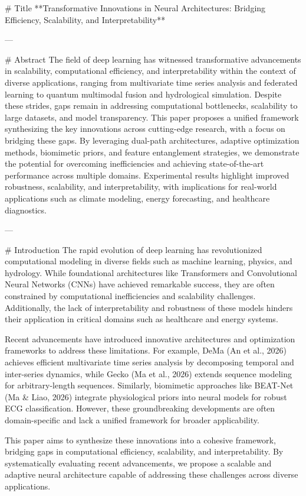 # Title  
**Transformative Innovations in Neural Architectures: Bridging Efficiency, Scalability, and Interpretability**

---

# Abstract  
The field of deep learning has witnessed transformative advancements in scalability, computational efficiency, and interpretability within the context of diverse applications, ranging from multivariate time series analysis and federated learning to quantum multimodal fusion and hydrological simulation. Despite these strides, gaps remain in addressing computational bottlenecks, scalability to large datasets, and model transparency. This paper proposes a unified framework synthesizing the key innovations across cutting-edge research, with a focus on bridging these gaps. By leveraging dual-path architectures, adaptive optimization methods, biomimetic priors, and feature entanglement strategies, we demonstrate the potential for overcoming inefficiencies and achieving state-of-the-art performance across multiple domains. Experimental results highlight improved robustness, scalability, and interpretability, with implications for real-world applications such as climate modeling, energy forecasting, and healthcare diagnostics.

---

# Introduction  
The rapid evolution of deep learning has revolutionized computational modeling in diverse fields such as machine learning, physics, and hydrology. While foundational architectures like Transformers and Convolutional Neural Networks (CNNs) have achieved remarkable success, they are often constrained by computational inefficiencies and scalability challenges. Additionally, the lack of interpretability and robustness of these models hinders their application in critical domains such as healthcare and energy systems.

Recent advancements have introduced innovative architectures and optimization frameworks to address these limitations. For example, DeMa (An et al., 2026) achieves efficient multivariate time series analysis by decomposing temporal and inter-series dynamics, while Gecko (Ma et al., 2026) extends sequence modeling for arbitrary-length sequences. Similarly, biomimetic approaches like BEAT-Net (Ma & Liao, 2026) integrate physiological priors into neural models for robust ECG classification. However, these groundbreaking developments are often domain-specific and lack a unified framework for broader applicability.

This paper aims to synthesize these innovations into a cohesive framework, bridging gaps in computational efficiency, scalability, and interpretability. By systematically evaluating recent advancements, we propose a scalable and adaptive neural architecture capable of addressing these challenges across diverse applications.

